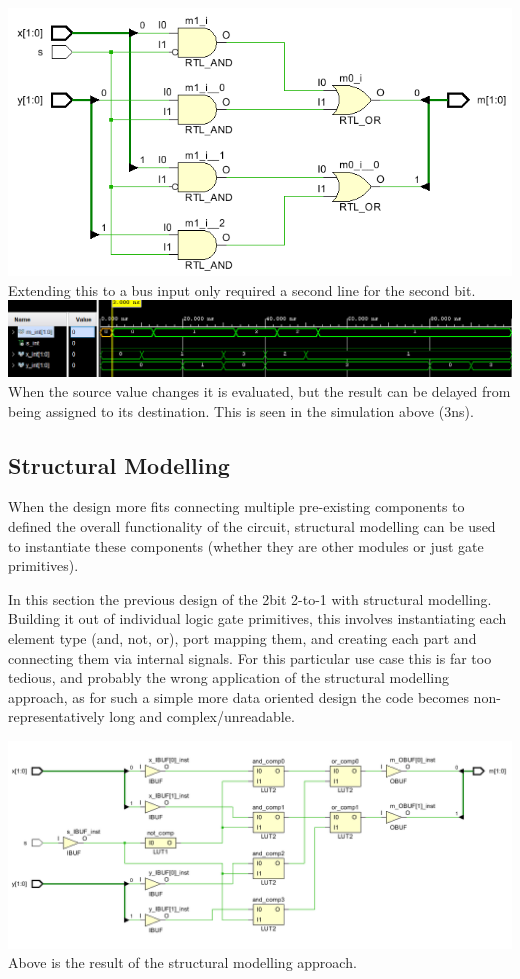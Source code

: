 \documentclass[11pt]{article}
\begin{document}
\begin{preview}
        \includegraphics[width=\textwidth]{res/part1/part1_2Wmux2_1.PNG}
        Extending this to a bus input only required a second line for the second bit.\\

        \includegraphics[width=\textwidth]{res/part1/part1_sim.PNG}
        When the source value changes it is evaluated, but the result can be delayed from being assigned to its destination. This is seen in the simulation above (3ns).\\ 

        \subsection{Structural Modelling}
        When the design more fits connecting multiple pre-existing components to defined the overall functionality of the circuit, structural modelling can be used to instantiate these components (whether they are other modules or just gate primitives).

        In this section the previous design of the 2bit 2-to-1 with structural modelling. Building it out of individual logic gate primitives, this involves instantiating each element type (and, not, or), port mapping them, and creating each part and connecting them via internal signals. For this particular use case this is far too tedious, and probably the wrong application of the structural modelling approach, as for such a simple more data oriented design the code becomes non-representatively long and complex/unreadable.

        \includegraphics[width=\textwidth]{res/part2/part2_2bitmux.PNG}
        Above is the result of the structural modelling approach.

\end{preview}
\end{document}
